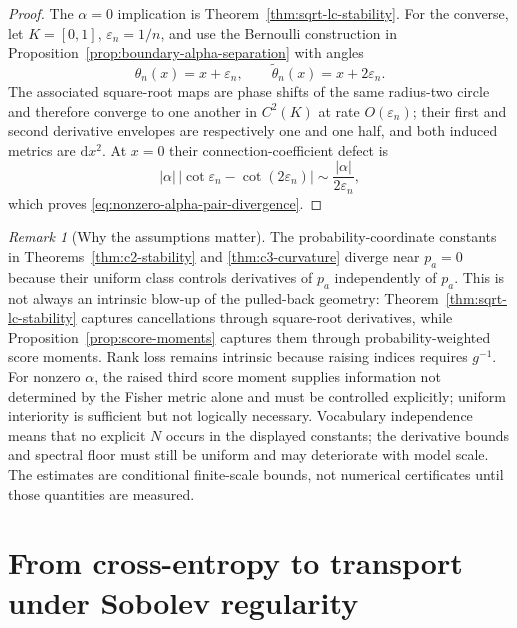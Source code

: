 \documentclass[11pt]{article}
\theoremstyle{definition}
\theoremstyle{remark}
\newtheorem{remark}[theorem]{Remark}
\newcommand{\dd}{\mathrm{d}}
\begin{document}
\begin{proof}
The $\alpha=0$ implication is Theorem~\ref{thm:sqrt-lc-stability}. For the converse, let $K=[0,1]$, $\varepsilon_n=1/n$, and use the Bernoulli construction in Proposition~\ref{prop:boundary-alpha-separation} with angles
\begin{equation}
    \theta_n(x)=x+\varepsilon_n,
    \qquad
    \widetilde\theta_n(x)=x+2\varepsilon_n.
\end{equation}
The associated square-root maps are phase shifts of the same radius-two circle and therefore converge to one another in $C^2(K)$ at rate $O(\varepsilon_n)$; their first and second derivative envelopes are respectively one and one half, and both induced metrics are $\dd x^2$. At $x=0$ their connection-coefficient defect is
\begin{equation}
    |\alpha|\,|\cot\varepsilon_n-\cot(2\varepsilon_n)|
    \sim \frac{|\alpha|}{2\varepsilon_n},
\end{equation}
which proves \eqref{eq:nonzero-alpha-pair-divergence}.
\end{proof}

\begin{remark}[Why the assumptions matter]
The probability-coordinate constants in Theorems~\ref{thm:c2-stability} and \ref{thm:c3-curvature} diverge near $p_a=0$ because their uniform class controls derivatives of $p_a$ independently of $p_a$. This is not always an intrinsic blow-up of the pulled-back geometry: Theorem~\ref{thm:sqrt-lc-stability} captures cancellations through square-root derivatives, while Proposition~\ref{prop:score-moments} captures them through probability-weighted score moments. Rank loss remains intrinsic because raising indices requires $g^{-1}$. For nonzero $\alpha$, the raised third score moment supplies information not determined by the Fisher metric alone and must be controlled explicitly; uniform interiority is sufficient but not logically necessary. Vocabulary independence means that no explicit $N$ occurs in the displayed constants; the derivative bounds and spectral floor must still be uniform and may deteriorate with model scale. The estimates are conditional finite-scale bounds, not numerical certificates until those quantities are measured.
\end{remark}

\section{From cross-entropy to transport under Sobolev regularity}\label{sec:risk-to-transport}
\end{document}
